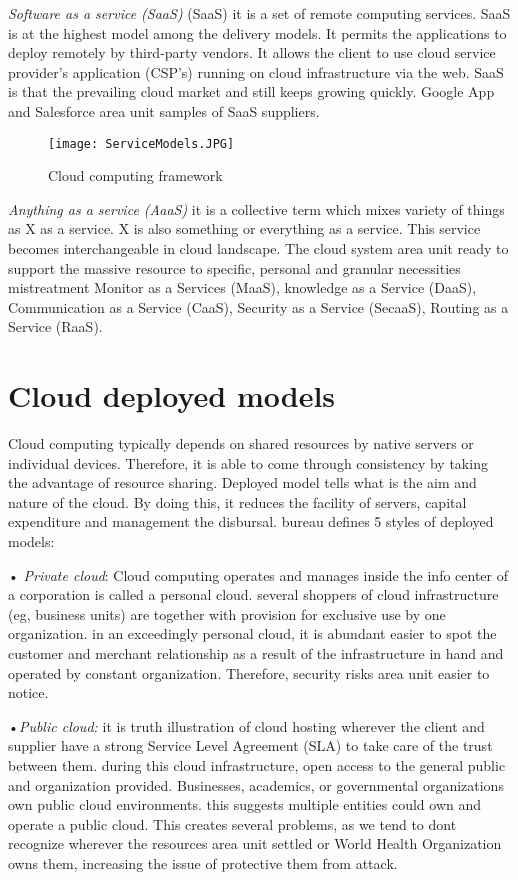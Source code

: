 \textit{Software as a service (SaaS)}  (SaaS) it is a set of remote computing services. SaaS is at the highest model among the delivery models. It permits the applications to deploy remotely by third-party vendors. It allows the client to use cloud service provider’s application (CSP’s) running on cloud infrastructure
via the web. SaaS is that the prevailing cloud market and still keeps growing quickly. Google App and Salesforce area unit samples of SaaS suppliers.

\begin{figure}[h]
	\centering
	\texttt{[image: ServiceModels.JPG]}
	\caption{Cloud computing framework}
	\label{fig:service-models}
\end{figure}


\textit{Anything as a service (AaaS)} it is a collective term which mixes variety of things as X as a service. X is also something or everything as a service. This service becomes interchangeable in cloud landscape. The cloud system area unit ready to support the massive resource to specific, personal and granular necessities mistreatment Monitor as a Services (MaaS), knowledge as a
Service (DaaS), Communication as a Service (CaaS), Security as a Service (SecaaS), Routing as a Service (RaaS).


\section{Cloud deployed models}
Cloud computing typically depends on shared resources by native servers or individual devices. Therefore, it is able to come through consistency by taking the advantage of resource sharing. Deployed model tells what is the aim and nature of the cloud. By doing this, it reduces the facility of servers, capital expenditure and management the disbursal. bureau defines 5 styles of deployed models:

•\textit{ Private cloud}: Cloud computing operates and manages inside the info center of a corporation is called a personal cloud. several shoppers of cloud infrastructure (eg, business units) are together with provision for exclusive use by one organization. in an exceedingly personal cloud, it is abundant easier to spot the customer and merchant relationship as a result of the infrastructure in hand and operated by constant organization. Therefore, security risks area unit easier to notice.

•\textit{Public cloud:} it is truth illustration of cloud hosting wherever the client and supplier have a strong Service Level Agreement (SLA) to take care of the trust between them. during this cloud infrastructure, open access to the general public and organization provided. Businesses, academics, or governmental organizations own public cloud environments. this suggests multiple entities could own and operate a public cloud. This creates several problems, as we tend to dont recognize wherever the resources area unit settled or World Health Organization owns them, increasing the issue of protective them from attack.

